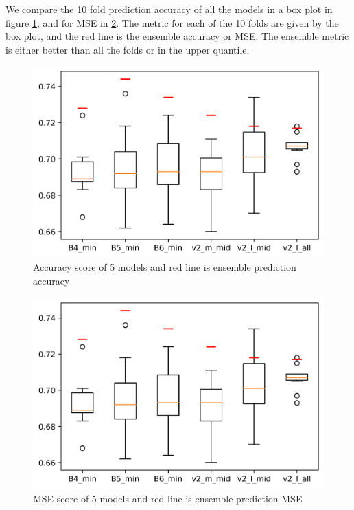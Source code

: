 \documentclass[10pt,letterpaper]{article}
\begin{document}
We compare the 10 fold prediction accuracy of all the models in a box plot in
figure \ref{marker4}, and for MSE in \ref{marker5}. The metric for
each of the 10 folds are given by the box plot, and the red line 
is the ensemble accuracy or MSE. The ensemble metric is either better than 
all the folds or in the upper quantile.

\begin{figure}[h!]
  \centering
  \begin{minipage}[b]{0.49\textwidth}
  \includegraphics[scale=0.2]{results/box_plot_models_acc.png}
    \caption{Accuracy score of 5 models and red line is ensemble prediction accuracy}
   \label{marker4}
  \end{minipage}
  \hfill
\end{figure}

\begin{figure}[h!]
  \centering
  \begin{minipage}[b]{0.49\textwidth}
  \includegraphics[scale=0.2]{results/box_plot_models_acc.png}
    \caption{MSE score of 5 models and red line is ensemble prediction MSE}
   \label{marker5}
  \end{minipage}
  \hfill
\end{figure}
\end{document}

